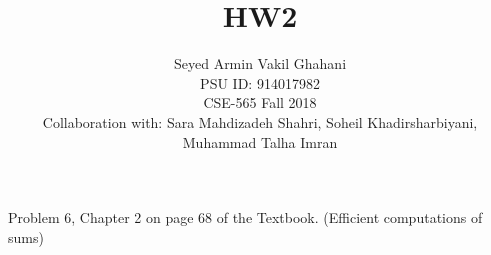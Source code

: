 \documentclass[11pt]{article}
\newenvironment{problem}[2][Problem]{\begin{trivlist}
\item[\hskip \labelsep {\bfseries #1}\hskip \labelsep {\bfseries #2.}]}{\end{trivlist}}
\begin{document}
 
\title{HW2}%
\author{Seyed Armin Vakil Ghahani\\ %
PSU ID: 914017982\\
CSE-565 Fall 2018\\
Collaboration with:
Sara Mahdizadeh Shahri, Soheil Khadirsharbiyani,\\
Muhammad Talha Imran} %
 
\maketitle
\begin{problem}{1}
Problem 6, Chapter 2 on page 68 of the Textbook. (Efficient computations of sums)
\end{problem}
\end{document}

